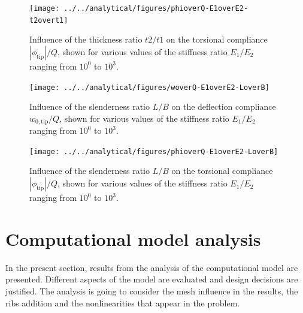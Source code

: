     \begin{figure}[!htpb] %
      \centering
      \texttt{[image: ../../analytical/figures/phioverQ-E1overE2-t2overt1]}
      \caption[Influence of the thickness ratio $t2/t1$ on the torsional compliance]{Influence of the thickness ratio $t2/t1$ on the torsional compliance $|\phi_{\mathrm{tip}}| / Q$, shown for various values of the stiffness ratio $E_1/E_2$ ranging from $10^0$ to $10^3$. }\label{fig:phioverQ-E1overE2-t2overt1}
    \end{figure}

    \begin{figure}[!htpb] %
      \centering
      \texttt{[image: ../../analytical/figures/woverQ-E1overE2-LoverB]}
      \caption[Influence of the slenderness ratio $L/B$ on the deflection compliance]{Influence of the slenderness ratio $L/B$ on the deflection compliance $w_{\mathrm{0,tip}} / Q$, shown for various values of the stiffness ratio $E_1/E_2$ ranging from $10^0$ to $10^3$. }\label{fig:woverQ-E1overE2-LoverB}
    \end{figure}

    \begin{figure}[!htpb] %
      \centering
      \texttt{[image: ../../analytical/figures/phioverQ-E1overE2-LoverB]}
      \caption[Influence of the slenderness ratio $L/B$ on the torsional compliance]{Influence of the slenderness ratio $L/B$ on the torsional compliance $|\phi_{\mathrm{tip}}| / Q$, shown for various values of the stiffness ratio $E_1/E_2$ ranging from $10^0$ to $10^3$. }\label{fig:phioverQ-E1overE2-LoverB}
    \end{figure}

\section{Computational model analysis} \label{sec:computationalModelAnalysis_results_model}

  In the present section, results from the analysis of the computational model are presented. Different aspects of the model are evaluated and design decisions are justified. The analysis is going to consider the mesh influence in the results, the ribs addition and the nonlinearities that appear in the problem.


